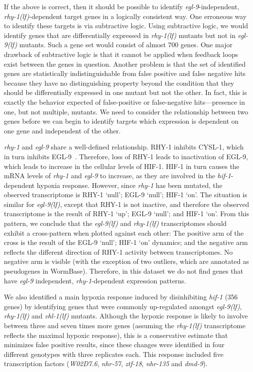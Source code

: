 \documentclass[9pt,twocolumn,twoside]{pnas-new}
\newcommand{\gene}[1]{\emph{#1}}
\newcommand{\nhr}{\emph{\mbox{nhr-57}}}
\newcommand{\egl}{\emph{\mbox{egl-9}(lf)}}
\newcommand{\rhy}{\emph{\mbox{rhy-1}(lf)}}
\newcommand{\vhl}{\emph{\mbox{vhl-1}(lf)}}
\newcommand{\eglp}{EGL-9}
\newcommand{\rhyp}{RHY-1}
\newcommand{\hifp}{HIF-1}
\newcommand{\cyslp}{CYSL-1}
\begin{document}
If the above is correct, then it should be possible to identify
\gene{egl-9}-independent, \rhy{}-dependent target genes in a
logically consistent way.
One erroneous way to identify these targets is via
subtractive logic. Using subtractive logic, we would identify genes that are
differentially expressed in \rhy{} mutants but not in \egl{} mutants.  Such a
gene set would
consist of almost 700 genes. One major drawback of subtractive logic is that it
cannot be applied when feedback loops exist between the genes in question.
Another problem is that the set of identified genes are statistically indistinguishable
from false positive and false negative hits because they have no distinguishing
property beyond the condition that they should be differentially expressed in
one mutant but not the other. In fact, this is exactly the behavior expected of
false-positive or false-negative hits---presence in one, but not multiple, mutants.
We need to consider the relationship between two genes before we can begin to
identify targets which expression is dependent on one gene and independent
of the other.

\gene{rhy-1} and \gene{egl-9} share a well-defined relationship. \rhyp{}
inhibits \cyslp{},
which in turn inhibits \eglp{}~\cite{Ma2012}. Therefore, loss of \rhyp{} leads
to inactivation of \eglp{}, which leads to increase in the cellular levels of
\hifp{}. \hifp{} in turn causes the mRNA levels of \gene{rhy-1} and \gene{egl-9}
to increase,
as they are involved in the \gene{hif-1}-dependent hypoxia response. However, since
\gene{rhy-1} has been mutated, the observed transcriptome is
\rhyp{} `null'; \eglp{} `null'; \hifp{} `on'. The situation is similar for
\egl{}, except that \rhyp{}
is not inactive, and therefore the observed transcriptome is the result of
\rhyp{} `up'; \eglp{} `null'; and \hifp{} `on'. From this pattern, we conclude that
the \egl{} and \rhy{} transcriptomes should exhibit a cross-pattern when plotted
against each other: The positive
arm of the cross is the result of the \eglp{} `null'; \hifp{} `on' dynamics; and the
negative arm reflects the different direction of \rhyp{} activity between
transcriptomes. No negative arm is visible (with the exception of two
outliers, which are annotated as pseudogenes in WormBase). Therefore, in this
dataset we do not find genes that have \gene{egl-9} independent,
\gene{rhy-1}-dependent expression patterns.

We also identified a main hypoxia response induced by disinhibiting
\gene{hif-1} (356 genes) by identifying genes that were commonly up-regulated
amongst \egl{}, \rhy{} and \vhl{} mutants. Although the hypoxic response is likely
to involve between three and seven times more genes (assuming the \rhy{} transcriptome
reflects the maximal hypoxic response), this is a conservative
estimate that minimizes false positive results, since these changes were
identified in four different genotypes with three replicates each. This response
included five transcription factors (\gene{W02D7.6}, \nhr{}, \gene{ztf-18},
\gene{nhr-135} and \gene{dmd-9}).
\end{document}
